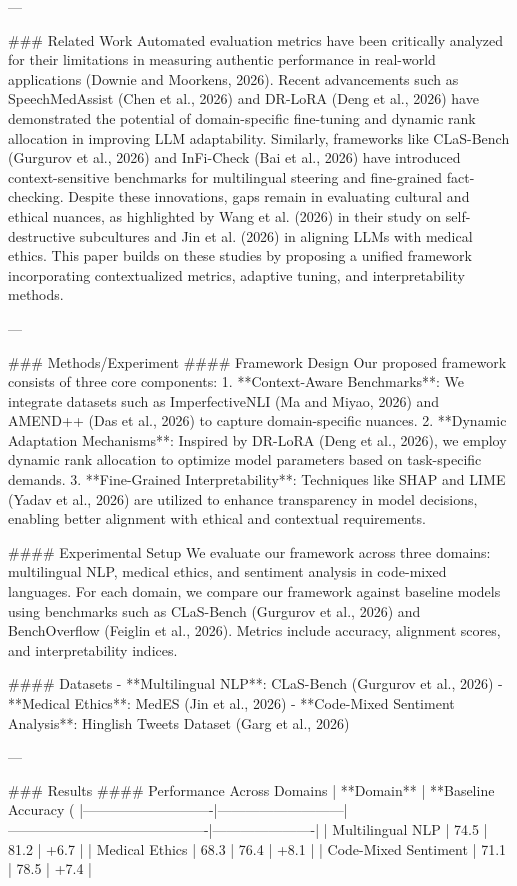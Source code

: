 ---

### Related Work  
Automated evaluation metrics have been critically analyzed for their limitations in measuring authentic performance in real-world applications (Downie and Moorkens, 2026). Recent advancements such as SpeechMedAssist (Chen et al., 2026) and DR-LoRA (Deng et al., 2026) have demonstrated the potential of domain-specific fine-tuning and dynamic rank allocation in improving LLM adaptability. Similarly, frameworks like CLaS-Bench (Gurgurov et al., 2026) and InFi-Check (Bai et al., 2026) have introduced context-sensitive benchmarks for multilingual steering and fine-grained fact-checking. Despite these innovations, gaps remain in evaluating cultural and ethical nuances, as highlighted by Wang et al. (2026) in their study on self-destructive subcultures and Jin et al. (2026) in aligning LLMs with medical ethics. This paper builds on these studies by proposing a unified framework incorporating contextualized metrics, adaptive tuning, and interpretability methods.

---

### Methods/Experiment  
#### Framework Design  
Our proposed framework consists of three core components:  
1. **Context-Aware Benchmarks**: We integrate datasets such as ImperfectiveNLI (Ma and Miyao, 2026) and AMEND++ (Das et al., 2026) to capture domain-specific nuances.  
2. **Dynamic Adaptation Mechanisms**: Inspired by DR-LoRA (Deng et al., 2026), we employ dynamic rank allocation to optimize model parameters based on task-specific demands.  
3. **Fine-Grained Interpretability**: Techniques like SHAP and LIME (Yadav et al., 2026) are utilized to enhance transparency in model decisions, enabling better alignment with ethical and contextual requirements.  

#### Experimental Setup  
We evaluate our framework across three domains: multilingual NLP, medical ethics, and sentiment analysis in code-mixed languages. For each domain, we compare our framework against baseline models using benchmarks such as CLaS-Bench (Gurgurov et al., 2026) and BenchOverflow (Feiglin et al., 2026). Metrics include accuracy, alignment scores, and interpretability indices.

#### Datasets  
- **Multilingual NLP**: CLaS-Bench (Gurgurov et al., 2026)  
- **Medical Ethics**: MedES (Jin et al., 2026)  
- **Code-Mixed Sentiment Analysis**: Hinglish Tweets Dataset (Garg et al., 2026)  

---

### Results  
#### Performance Across Domains  
| **Domain**                | **Baseline Accuracy (%
|----------------------------|---------------------------|-------------------------------------------|----------------------|  
| Multilingual NLP           | 74.5                     | 81.2                                      | +6.7                |  
| Medical Ethics             | 68.3                     | 76.4                                      | +8.1                |  
| Code-Mixed Sentiment       | 71.1                     | 78.5                                      | +7.4                |  

